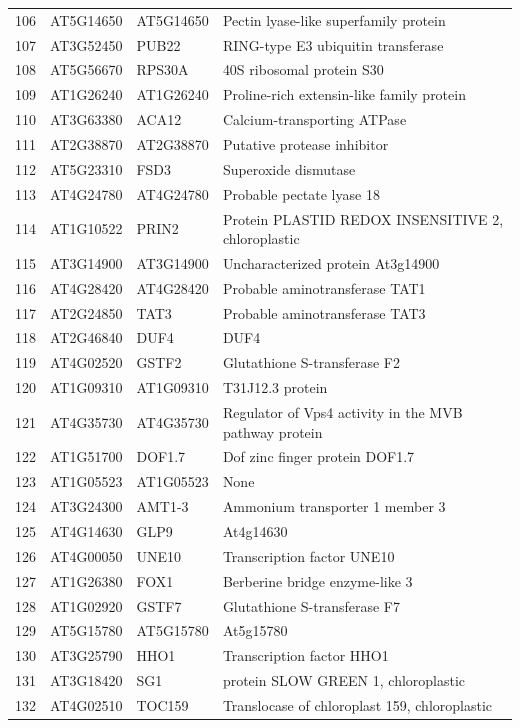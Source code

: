 \documentclass[11pt]{article}
\begin{document}
\begin{center}
\begin{tabular}{rlll}
106 & AT5G14650 & AT5G14650 & Pectin lyase-like superfamily protein\\
107 & AT3G52450 & PUB22 & RING-type E3 ubiquitin transferase\\
108 & AT5G56670 & RPS30A & 40S ribosomal protein S30\\
109 & AT1G26240 & AT1G26240 & Proline-rich extensin-like family protein\\
110 & AT3G63380 & ACA12 & Calcium-transporting ATPase\\
111 & AT2G38870 & AT2G38870 & Putative protease inhibitor\\
112 & AT5G23310 & FSD3 & Superoxide dismutase\\
113 & AT4G24780 & AT4G24780 & Probable pectate lyase 18\\
114 & AT1G10522 & PRIN2 & Protein PLASTID REDOX INSENSITIVE 2, chloroplastic\\
115 & AT3G14900 & AT3G14900 & Uncharacterized protein At3g14900\\
116 & AT4G28420 & AT4G28420 & Probable aminotransferase TAT1\\
117 & AT2G24850 & TAT3 & Probable aminotransferase TAT3\\
118 & AT2G46840 & DUF4 & DUF4\\
119 & AT4G02520 & GSTF2 & Glutathione S-transferase F2\\
120 & AT1G09310 & AT1G09310 & T31J12.3 protein\\
121 & AT4G35730 & AT4G35730 & Regulator of Vps4 activity in the MVB pathway protein\\
122 & AT1G51700 & DOF1.7 & Dof zinc finger protein DOF1.7\\
123 & AT1G05523 & AT1G05523 & None\\
124 & AT3G24300 & AMT1-3 & Ammonium transporter 1 member 3\\
125 & AT4G14630 & GLP9 & At4g14630\\
126 & AT4G00050 & UNE10 & Transcription factor UNE10\\
127 & AT1G26380 & FOX1 & Berberine bridge enzyme-like 3\\
128 & AT1G02920 & GSTF7 & Glutathione S-transferase F7\\
129 & AT5G15780 & AT5G15780 & At5g15780\\
130 & AT3G25790 & HHO1 & Transcription factor HHO1\\
131 & AT3G18420 & SG1 & protein SLOW GREEN 1, chloroplastic\\
132 & AT4G02510 & TOC159 & Translocase of chloroplast 159, chloroplastic\\

\end{tabular}
\end{center}
\end{document}
